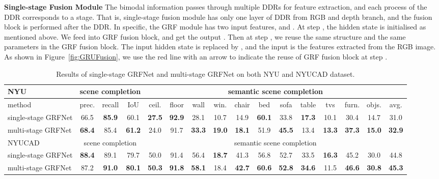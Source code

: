 \documentclass[10pt,twocolumn,letterpaper]{article}
\begin{document}
\noindent
\textbf{Single-stage Fusion Module} The bimodal information passes through multiple DDRs for feature extraction, and each process of the DDR corresponds to a stage. That is, single-stage fusion module has only one layer of DDR from RGB and depth branch, and the fusion block is performed after the DDR. In specific, the GRF module has two input features,  and .
At step , the hidden state is initialised as mentioned above. We feed  into GRF fusion block, and get the output .
Then at step , we reuse the same structure and the same parameters in the GRF fusion block. The input hidden state is replaced by , and the input is the features  extracted from the RGB image.
As shown in Figure~\ref{fig:GRUFusion}, we use the red line with an arrow to indicate the reuse of GRF fusion block at step .

\begin{table*}[t]
\begin{center}
\scalebox{0.91}
{
\begin{tabular} {l |c c c|c c c c c c c c c c c|c} \hline
NYU &  \multicolumn{3}{c|}{scene completion} & \multicolumn{12}{c}{semantic scene completion} \\ 
\hline
method  & prec. & recall & IoU & \cellcolor{rgb1}ceil. & \cellcolor{rgb2}floor & \cellcolor{rgb3}wall & \cellcolor{rgb4}win. & \cellcolor{rgb5}chair & \cellcolor{rgb6}bed & \cellcolor{rgb7}sofa & \cellcolor{rgb8}table & \cellcolor{rgb9}tvs & \cellcolor{rgb10}furn. & \cellcolor{rgb11}objs. & avg. \\ 
\hline
single-stage GRFNet   & 66.5 & {\bfseries85.9} & 60.1 & {\bfseries27.5} & {\bfseries92.9} & 28.1 & 10.7 & 14.9 & {\bfseries60.1} & 33.8 & {\bfseries17.3} & 10.1 & 30.4 & 14.7 & 31.0 \\

multi-stage GRFNet    & {\bfseries68.4} & 85.4 &{\bfseries 61.2} & 24.0 & 91.7 &{\bfseries 33.3} & {\bfseries19.0} & {\bfseries18.1} & 51.9 &{\bfseries 45.5} & 13.4 & {\bfseries13.3} & {\bfseries37.3} & {\bfseries15.0} & {\bfseries32.9}  \\
\hline
\hline
NYUCAD &  \multicolumn{3}{c|}{scene completion} & \multicolumn{12}{c}{semantic scene completion} \\ 
\hline
single-stage GRFNet  & {\bfseries88.4} & 89.1 & 79.7 & 50.0 & 91.4 & 56.4 & {\bfseries18.7} & 41.3 & 56.8 & 52.7 & 33.5 & {\bfseries16.3} & 45.2 & 30.0 & 44.8 \\

multi-stage GRFNet   & 87.2 &{\bfseries 91.0} & {\bfseries80.1} & {\bfseries50.3} & {\bfseries91.8} & {\bfseries58.1} & 18.4 &{\bfseries 42.7} & {\bfseries60.6} & {\bfseries52.8} & {\bfseries34.6} & 11.5 & {\bfseries46.6} & {\bfseries30.8} & {\bfseries45.3} \\
\hline
\end{tabular}
}  \caption{Results of single-stage GRFNet and multi-stage GRFNet on both NYU and NYUCAD dataset.}
\label{tab:single-vs-multi-stage}
\vspace{-0.5cm}
\end{center}
\end{table*}
\end{document}
